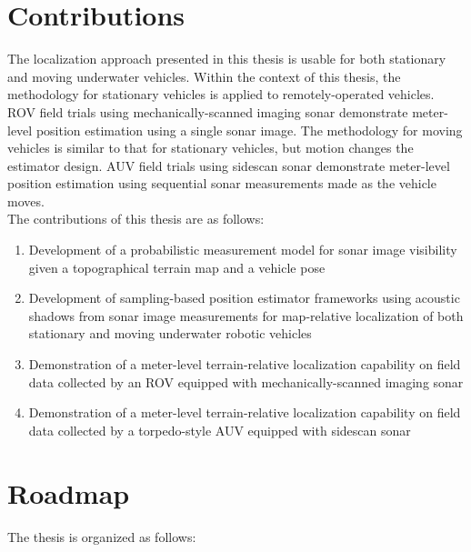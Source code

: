 \section{Contributions}
\label{intro.Contributions}

The localization approach presented in this thesis is usable for both stationary and moving underwater vehicles.  
Within the context of this thesis, the methodology for stationary vehicles is applied to remotely-operated vehicles. 
ROV field trials using mechanically-scanned imaging sonar demonstrate meter-level position estimation using a single sonar image. 
The methodology for moving vehicles is similar to that for stationary vehicles, but motion changes the estimator design.  
AUV field trials using sidescan sonar demonstrate meter-level position estimation using sequential sonar measurements made as the vehicle moves.
\\

\noindent The contributions of this thesis are as follows:

\begin{enumerate}
	\item Development of a probabilistic measurement model for sonar image visibility given a topographical terrain map and a vehicle pose
	\item Development of sampling-based position estimator frameworks using acoustic shadows from sonar image measurements for map-relative localization of both stationary and moving underwater robotic vehicles
	\item Demonstration of a meter-level terrain-relative localization capability on field data collected by an ROV equipped with mechanically-scanned imaging sonar
	\item Demonstration of a meter-level terrain-relative localization capability on field data collected by a torpedo-style AUV equipped with sidescan sonar 
\end{enumerate}

\section{Roadmap}

The thesis is organized as follows:

